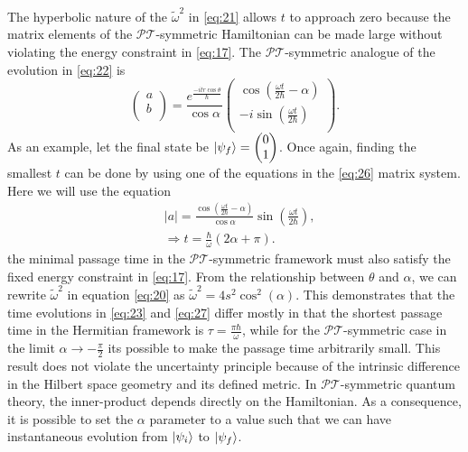 \documentclass[12pt, a4paper]{report}
\newenvironment{Figure}
    {\par\medskip\noindent\minipage{\linewidth}}
    {\endminipage\par\medskip}
\newcommand\PT{\(\mathcal{PT}\)}
\begin{document}
The hyperbolic nature of the $\tilde{\omega}^2$ in \ref{eq:21}  allows $t$ to approach zero because the matrix elements of the \PT -symmetric Hamiltonian can be made large without violating the energy constraint in \ref{eq:17}\cite{Bender_2007}. The \PT-symmetric analogue of the evolution in \ref{eq:22} is
\begin{equation}\label{eq:26}
\begin{pmatrix}
a \\
b \\                
\end{pmatrix} = \frac{e^{\frac{-itr \cos\theta}{\hbar}}}{\cos{\alpha}}
\begin{pmatrix}
\cos(\frac{\omega t}{2 \hbar} - \alpha)\\
- i \sin(\frac{\omega t}{2\hbar})\\
\end{pmatrix}.
\end{equation}
As an example, let the final state be $\ket{\psi_f} = \begin{pmatrix}0 \\1 \\\end{pmatrix}$. Once again, finding the smallest $t$ can be done by using one of the equations in the \ref{eq:26} matrix system. Here we will use the equation
\begin{align}\label{eq:27}
&|a|= \frac{\cos(\frac{\omega t}{2 \hbar} -\alpha)}{\cos{\alpha}} \sin\left(\frac{\omega t}{2\hbar}\right),\nonumber\\
&\Rightarrow t = \frac{\hbar}{\omega}(2 \alpha + \pi).
\end{align}
the minimal passage time in the \PT-symmetric framework must also satisfy the fixed energy constraint in \ref{eq:17}. From the relationship between $\theta$ and $\alpha$, we can rewrite $\tilde{\omega}^2$ in equation \ref{eq:20} as $\tilde{\omega}^2 = 4s^2\cos^2(\alpha)$. This demonstrates that the time evolutions in \ref{eq:23} and \ref{eq:27} differ mostly in that the shortest passage time in the Hermitian framework is $\tau = \frac{\pi\hbar}{\omega}$, while for the \PT-symmetric case in the limit $\alpha \rightarrow -\frac{\pi}{2}$ its possible to make the passage time arbitrarily small.
This result does not violate the uncertainty principle because of the intrinsic difference in the Hilbert space geometry and its defined metric. In \PT-symmetric quantum theory, the inner-product depends directly on the
Hamiltonian. As a consequence, it is possible to set the $\alpha$ parameter to a value such that we can have instantaneous evolution from $\ket{\psi_i}$ to $\ket{\psi_f}$.
\end{document}
